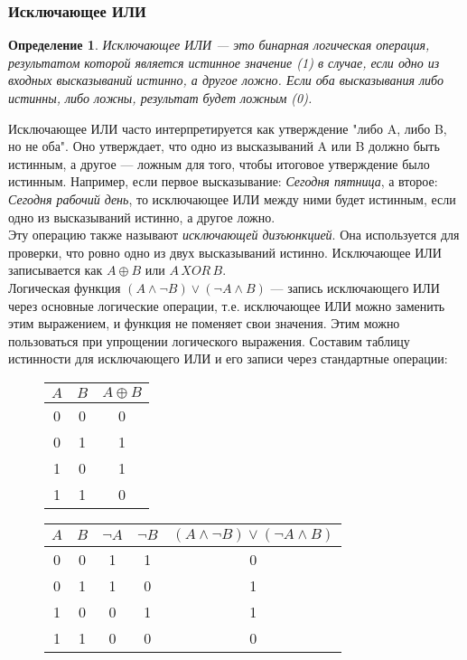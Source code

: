 \documentclass[12pt]{article}
\newtheorem{definition}{Определение}[section]
\theoremstyle{problem_style}
\begin{document}
\subsubsection{Исключающее ИЛИ}
\begin{definition}
Исключающее ИЛИ — это бинарная логическая операция, результатом которой является истинное значение (1) в случае, если одно из входных высказываний истинно, а другое ложно. Если оба высказывания либо истинны, либо ложны, результат будет ложным (0).
\end{definition}
Исключающее ИЛИ часто интерпретируется как утверждение "либо A, либо B, но не оба". Оно утверждает, что одно из высказываний A или B должно быть истинным, а другое — ложным для того, чтобы итоговое утверждение было истинным. Например, если первое высказывание: \textit{Сегодня пятница}, а второе: \textit{Сегодня рабочий день}, то исключающее ИЛИ между ними будет истинным, если одно из высказываний истинно, а другое ложно.\\
Эту операцию также называют \textit{исключающей дизъюнкцией}. Она используется для проверки, что ровно одно из двух высказываний истинно. Исключающее ИЛИ записывается как \(A \oplus B\) или \(A \, XOR \, B\).\\
Логическая функция \((A \land \neg B) \lor (\neg A \land B)\) — запись исключающего ИЛИ через основные логические операции, т.е. исключающее ИЛИ можно заменить этим выражением, и функция не поменяет свои значения. Этим можно пользоваться при упрощении логического выражения.
Составим таблицу истинности для исключающего ИЛИ и его записи через стандартные операции:
\begin{figure}[h!]
    \begin{minipage}{0.45\linewidth}
    \centering
    \begin{tabular}{|c|c|c|}
    \hline
    $A$ & $B$ & $A \oplus B$ \\
    \hline
    0 & 0 & 0 \\
    0 & 1 & 1 \\
    1 & 0 & 1 \\
    1 & 1 & 0 \\
    \hline
    \end{tabular}
    \end{minipage}
    \hspace{0.5cm}
    \begin{minipage}{0.45\linewidth}
    \centering
    \begin{tabular}{|c|c|c|c|c|}
    \hline
    $A$ & $B$ & $\lnot A$ & $\lnot B$ & $(A \land \lnot B) \lor (\lnot A \land B)$ \\
    \hline
    0 & 0 & 1 & 1 & 0\\
    0 & 1 & 1 & 0 & 1\\
    1 & 0 & 0 & 1 & 1\\
    1 & 1 & 0 & 0 & 0\\
    \hline
    \end{tabular}
    \end{minipage}
\end{figure}
\end{document}
